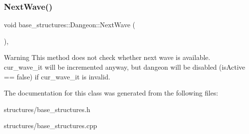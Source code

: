 \subsubsection{\texorpdfstring{Next\+Wave()}{NextWave()}}
{\footnotesize\ttfamily void base\+\_\+structures\+::\+Dangeon\+::\+Next\+Wave (\begin{DoxyParamCaption}{ }\end{DoxyParamCaption})\hspace{0.3cm}{\ttfamily [inline]}, {\ttfamily [noexcept]}}

\begin{DoxyWarning}{Warning}
This method does not check whether next wave is available. cur\+\_\+wave\+\_\+it will be incremented anyway, but dangeon will be disabled (is\+Active == false) if cur\+\_\+wave\+\_\+it is invalid. 
\end{DoxyWarning}


The documentation for this class was generated from the following files\+:\begin{DoxyCompactItemize}
\item 
structures/base\+\_\+structures.\+h\item 
structures/base\+\_\+structures.\+cpp\end{DoxyCompactItemize}
